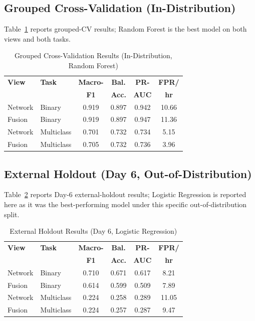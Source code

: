 \documentclass[conference]{IEEEtran}
\begin{document}
\subsection{Grouped Cross-Validation (In-Distribution)}
Table~\ref{tab:groupedcv} reports grouped-CV results; Random Forest is the best model on both views and both tasks.

\begin{table}[t]
\centering
\caption{Grouped Cross-Validation Results (In-Distribution, Random Forest)}
\label{tab:groupedcv}
\begin{tabular}{llcccc}
\toprule
\textbf{View} & \textbf{Task} & \textbf{Macro-} & \textbf{Bal.} & \textbf{PR-} & \textbf{FPR/} \\
 & & \textbf{F1} & \textbf{Acc.} & \textbf{AUC} & \textbf{hr} \\
\midrule
Network & Binary & 0.919 & 0.897 & 0.942 & 10.66 \\
Fusion & Binary & 0.919 & 0.897 & 0.947 & 11.36 \\
Network & Multiclass & 0.701 & 0.732 & 0.734 & 5.15 \\
Fusion & Multiclass & 0.705 & 0.732 & 0.736 & 3.96 \\
\bottomrule
\end{tabular}
\end{table}

\subsection{External Holdout (Day 6, Out-of-Distribution)}
Table~\ref{tab:day6} reports Day-6 external-holdout results; Logistic Regression is reported here as it was the best-performing model under this specific out-of-distribution split.

\begin{table}[t]
\centering
\caption{External Holdout Results (Day 6, Logistic Regression)}
\label{tab:day6}
\begin{tabular}{llcccc}
\toprule
\textbf{View} & \textbf{Task} & \textbf{Macro-} & \textbf{Bal.} & \textbf{PR-} & \textbf{FPR/} \\
 & & \textbf{F1} & \textbf{Acc.} & \textbf{AUC} & \textbf{hr} \\
\midrule
Network & Binary & 0.710 & 0.671 & 0.617 & 8.21 \\
Fusion & Binary & 0.614 & 0.599 & 0.509 & 7.89 \\
Network & Multiclass & 0.224 & 0.258 & 0.289 & 11.05 \\
Fusion & Multiclass & 0.224 & 0.257 & 0.287 & 9.47 \\
\bottomrule
\end{tabular}
\end{table}
\end{document}
